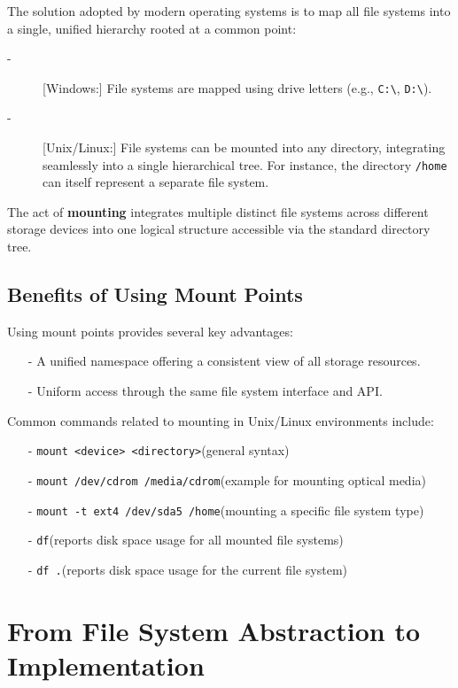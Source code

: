 \documentclass[../../compsys.tex]{subfiles}
\begin{document}
The solution adopted by modern operating systems is to map all file systems into a single, unified hierarchy rooted at a common point:
\begin{description}
    \item[-][Windows:] File systems are mapped using drive letters (e.g., \texttt{C:\textbackslash}, \texttt{D:\textbackslash}).
    \item[-][Unix/Linux:] File systems can be mounted into any directory, integrating seamlessly into a single hierarchical tree. For instance, the directory \texttt{/home} can itself represent a separate file system.
\end{description}

The act of \textbf{mounting} integrates multiple distinct file systems across different storage devices into one logical structure accessible via the standard directory tree.
\newpage
\subsection{Benefits of Using Mount Points}
Using mount points provides several key advantages:
\begin{itemize}[itemsep=2pt, topsep=1pt]
    \item[-] A unified namespace offering a consistent view of all storage resources.
    \item[-] Uniform access through the same file system interface and API.
\end{itemize}

Common commands related to mounting in Unix/Linux environments include:
\begin{itemize}
    \item[-] \texttt{mount <device> <directory>}\quad (general syntax)
    \item[-] \texttt{mount /dev/cdrom /media/cdrom}\quad (example for mounting optical media)
    \item[-] \texttt{mount -t ext4 /dev/sda5 /home}\quad (mounting a specific file system type)
    \item[-] \texttt{df}\quad (reports disk space usage for all mounted file systems)
    \item[-] \texttt{df .}\quad (reports disk space usage for the current file system)
\end{itemize}

\section{From File System Abstraction to Implementation}
\end{document}
